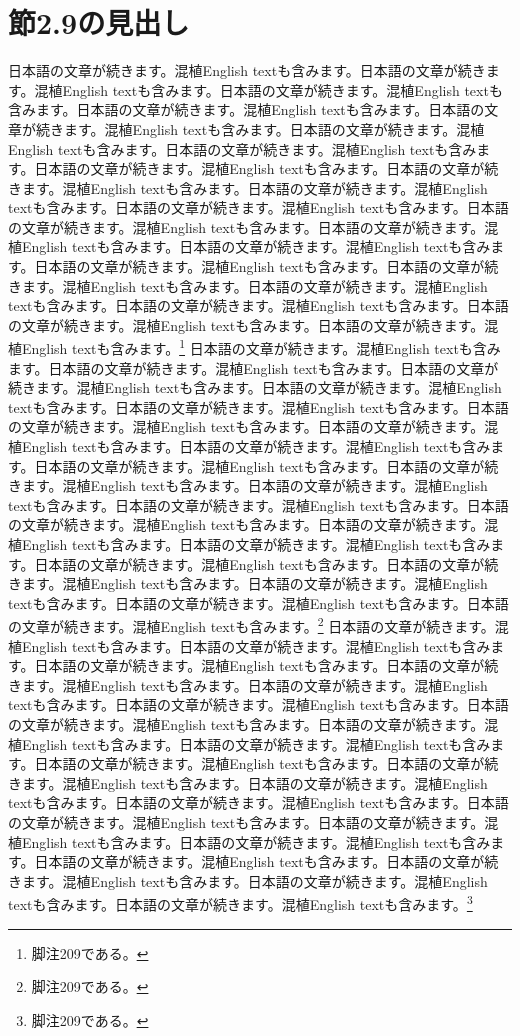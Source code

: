 \documentclass[pdflatex,book]{jlreq}
\begin{document}
\section{節2.9の見出し}
日本語の文章が続きます。混植English textも含みます。日本語の文章が続きます。混植English textも含みます。日本語の文章が続きます。混植English textも含みます。日本語の文章が続きます。混植English textも含みます。日本語の文章が続きます。混植English textも含みます。日本語の文章が続きます。混植English textも含みます。日本語の文章が続きます。混植English textも含みます。日本語の文章が続きます。混植English textも含みます。日本語の文章が続きます。混植English textも含みます。日本語の文章が続きます。混植English textも含みます。日本語の文章が続きます。混植English textも含みます。日本語の文章が続きます。混植English textも含みます。日本語の文章が続きます。混植English textも含みます。日本語の文章が続きます。混植English textも含みます。日本語の文章が続きます。混植English textも含みます。日本語の文章が続きます。混植English textも含みます。日本語の文章が続きます。混植English textも含みます。日本語の文章が続きます。混植English textも含みます。日本語の文章が続きます。混植English textも含みます。日本語の文章が続きます。混植English textも含みます。\footnote{脚注209である。}
日本語の文章が続きます。混植English textも含みます。日本語の文章が続きます。混植English textも含みます。日本語の文章が続きます。混植English textも含みます。日本語の文章が続きます。混植English textも含みます。日本語の文章が続きます。混植English textも含みます。日本語の文章が続きます。混植English textも含みます。日本語の文章が続きます。混植English textも含みます。日本語の文章が続きます。混植English textも含みます。日本語の文章が続きます。混植English textも含みます。日本語の文章が続きます。混植English textも含みます。日本語の文章が続きます。混植English textも含みます。日本語の文章が続きます。混植English textも含みます。日本語の文章が続きます。混植English textも含みます。日本語の文章が続きます。混植English textも含みます。日本語の文章が続きます。混植English textも含みます。日本語の文章が続きます。混植English textも含みます。日本語の文章が続きます。混植English textも含みます。日本語の文章が続きます。混植English textも含みます。日本語の文章が続きます。混植English textも含みます。日本語の文章が続きます。混植English textも含みます。\footnote{脚注209である。}
日本語の文章が続きます。混植English textも含みます。日本語の文章が続きます。混植English textも含みます。日本語の文章が続きます。混植English textも含みます。日本語の文章が続きます。混植English textも含みます。日本語の文章が続きます。混植English textも含みます。日本語の文章が続きます。混植English textも含みます。日本語の文章が続きます。混植English textも含みます。日本語の文章が続きます。混植English textも含みます。日本語の文章が続きます。混植English textも含みます。日本語の文章が続きます。混植English textも含みます。日本語の文章が続きます。混植English textも含みます。日本語の文章が続きます。混植English textも含みます。日本語の文章が続きます。混植English textも含みます。日本語の文章が続きます。混植English textも含みます。日本語の文章が続きます。混植English textも含みます。日本語の文章が続きます。混植English textも含みます。日本語の文章が続きます。混植English textも含みます。日本語の文章が続きます。混植English textも含みます。日本語の文章が続きます。混植English textも含みます。日本語の文章が続きます。混植English textも含みます。\footnote{脚注209である。}
\end{document}
